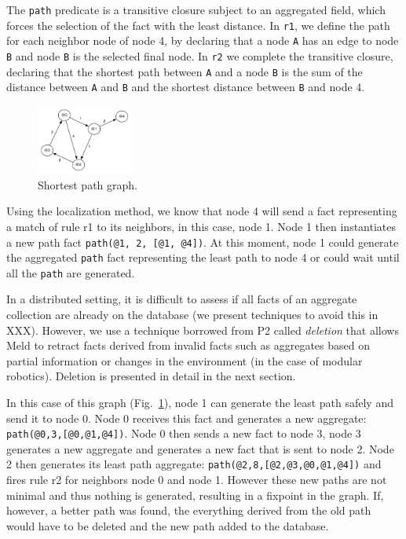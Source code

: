 \documentclass[preprint]{sigplanconf}
\begin{document}
The \texttt{path} predicate is a transitive closure
subject to an aggregated field, which forces the selection
of the fact with the least distance. In \texttt{r1}, we define the path
for each neighbor node of node 4, by declaring that a node \texttt{A} has an edge to node \texttt{B}
and node \texttt{B} is the selected final node.
In \texttt{r2} we complete the transitive closure, declaring that the shortest path between \texttt{A}
and a node \texttt{B} is the sum of the distance between \texttt{A} and \texttt{B} and the
shortest distance between \texttt{B} and node 4.

\begin{figure}[ht]
  \centering
    \includegraphics[width=0.28\textwidth]{figures/shortestpathgraph.pdf}
  \caption{Shortest path graph.}
  \label{fig:shortestpathfig}
\end{figure}

Using the localization method, we know that node 4 will send a fact representing
a match of rule r1 to its neighbors, in this case, node 1. Node 1 then instantiates a new
path fact \texttt{path(@1,~2,~[@1, @4])}. At this moment, node 1 could generate the aggregated
\texttt{path} fact representing the least path to node 4 or could wait until all the \texttt{path}
are generated.

In a distributed setting, it is difficult to assess if all facts of an
aggregate collection are already on the database (we present techniques to avoid this in XXX).
However, we use a technique borrowed from P2 called \emph{deletion} that allows Meld
to retract facts derived from invalid facts such as aggregates based on partial information
or changes in the environment (in the case of modular robotics). Deletion
is presented in detail in the next section.

In this case of this graph (Fig.~\ref{fig:shortestpathfig}), node 1 can generate the least path
safely and send it to node 0. Node 0 receives this fact and generates a new aggregate: \texttt{path(@0,3,[@0,@1,@4])}. Node 0 then sends a new fact to node 3, node 3 generates a
new aggregate and generates a new fact that is sent to node 2. Node 2 then generates its
least path aggregate: \texttt{path(@2,8,[@2,@3,@0,@1,@4])} and fires rule r2 for neighbors
node 0 and node 1. However these new paths are not minimal and thus nothing is generated,
resulting in a fixpoint in the graph. If, however, a better path was found, the everything
derived from the old path would have to be deleted and the new path added to the database.
\end{document}
